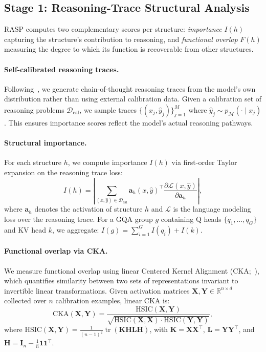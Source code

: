 \subsection{Stage 1: Reasoning-Trace Structural Analysis}
\label{sec:stage1}

RASP computes two complementary scores per structure: \emph{importance} $I(h)$ capturing the structure's contribution to reasoning, and \emph{functional overlap} $F(h)$ measuring the degree to which its function is recoverable from other structures.

\paragraph{Self-calibrated reasoning traces.}
Following~\citet{resp2025}, we generate chain-of-thought reasoning traces from the model's own distribution rather than using external calibration data.
Given a calibration set of reasoning problems $\mathcal{D}_\text{cal}$, we sample traces $\{(x_j, \hat{y}_j)\}_{j=1}^{M}$ where $\hat{y}_j \sim p_\mathcal{M}(\cdot \mid x_j)$.
This ensures importance scores reflect the model's actual reasoning pathways.

\paragraph{Structural importance.}
For each structure $h$, we compute importance $I(h)$ via first-order Taylor expansion on the reasoning trace loss:
\begin{equation}
    I(h) = \left| \sum_{(x,\hat{y}) \in \mathcal{D}_\text{cal}} \mathbf{a}_h(x, \hat{y})^\top \frac{\partial \mathcal{L}(x, \hat{y})}{\partial \mathbf{a}_h} \right|,
    \label{eq:importance}
\end{equation}
where $\mathbf{a}_h$ denotes the activation of structure $h$ and $\mathcal{L}$ is the language modeling loss over the reasoning trace.
For a GQA group $g$ containing Q heads $\{q_1, \ldots, q_G\}$ and KV head $k$, we aggregate: $I(g) = \sum_{i=1}^{G} I(q_i) + I(k)$.

\paragraph{Functional overlap via CKA.}
We measure functional overlap using linear Centered Kernel Alignment (CKA;~\citealp{kornblith2019cka}), which quantifies similarity between two sets of representations invariant to invertible linear transformations.
Given activation matrices $\mathbf{X}, \mathbf{Y} \in \mathbb{R}^{n \times d}$ collected over $n$ calibration examples, linear CKA is:
\begin{equation}
    \text{CKA}(\mathbf{X}, \mathbf{Y}) = \frac{\text{HSIC}(\mathbf{X}, \mathbf{Y})}{\sqrt{\text{HSIC}(\mathbf{X}, \mathbf{X}) \cdot \text{HSIC}(\mathbf{Y}, \mathbf{Y})}},
    \label{eq:cka}
\end{equation}
where $\text{HSIC}(\mathbf{X}, \mathbf{Y}) = \frac{1}{(n-1)^2} \operatorname{tr}(\mathbf{K} \mathbf{H} \mathbf{L} \mathbf{H})$, with $\mathbf{K} = \mathbf{X}\mathbf{X}^\top$, $\mathbf{L} = \mathbf{Y}\mathbf{Y}^\top$, and $\mathbf{H} = \mathbf{I}_n - \frac{1}{n}\mathbf{1}\mathbf{1}^\top$.

